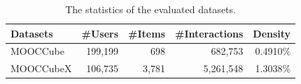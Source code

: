 \begin{table}[t]
  \centering
  \caption{The statistics of the evaluated datasets.}
  \label{tab:dataset-statistics}
  \renewcommand{\arraystretch}{1.05}
  \setlength{\tabcolsep}{8pt}
  \begin{tabular}{lrrrr}
    \toprule
    \textbf{Datasets} & \textbf{\#Users} & \textbf{\#Items} & \textbf{\#Interactions} & \textbf{Density} \\
    \midrule
    MOOCCube  & 199,199 & 698   & 682,753   & 0.4910\% \\
    MOOCCubeX & 106,735 & 3,781 & 5,261,548 & 1.3038\% \\
    \bottomrule
  \end{tabular}
\end{table}

